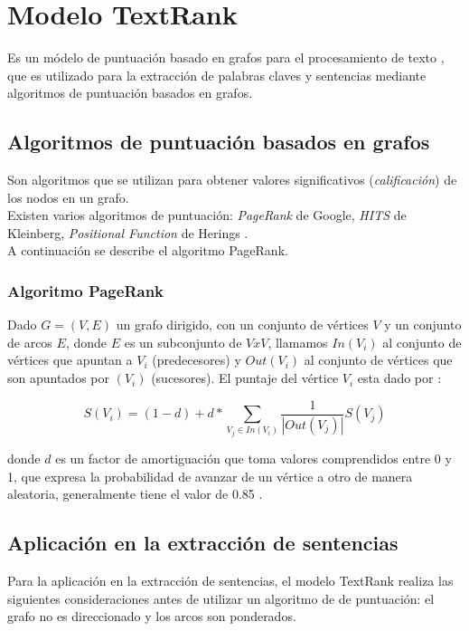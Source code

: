 \section{Modelo TextRank}
Es un m\'odelo de puntuaci\'on basado en grafos para el procesamiento de
texto \cite{RMPT04}, que es utilizado para la extracci\'on de palabras claves
y sentencias mediante algoritmos de puntuaci\'on basados en grafos.

\subsection{Algoritmos de puntuaci\'on basados en grafos}
Son algoritmos que se utilizan para obtener valores significativos
(\emph{calificaci\'on}) de los nodos en un grafo. \\

Existen varios algoritmos de puntuaci\'on: \emph{PageRank} de Google,
\emph{HITS} de Kleinberg, \emph{Positional Function} de Herings \cite{RM04}. \\

A continuaci\'on se describe el algoritmo PageRank.

\subsubsection{Algoritmo PageRank}
Dado $G=(V,E)$ un grafo dirigido, con un conjunto de v\'ertices $V$ y un conjunto
de arcos $E$, donde $E$ es un subconjunto de $V x V$, llamamos $In(V_i)$ al
conjunto de v\'ertices que apuntan a $V_i$ (predecesores) y $Out(V_i)$ al 
conjunto de v\'ertices que son apuntados por $(V_i)$ (sucesores). El puntaje del
v\'ertice $V_i$ esta dado por \cite{SBLP98}:

\begin{equation}
	S(V_i) = (1 - d) + d * \sum_{V_j\in In(V_i)}{\frac{1}{|Out(V_j)|}S(V_j)}
\end{equation}

donde $d$ es un factor de amortiguaci\'on que toma valores comprendidos entre
0 y 1, que expresa la probabilidad de avanzar de un v\'ertice a otro de manera
aleatoria, generalmente tiene el valor de 0.85 \cite{SBLP98}.

\subsection{Aplicaci\'on en la extracci\'on de sentencias} 
Para la aplicaci\'on en la extracci\'on de sentencias, el modelo TextRank realiza
las siguientes consideraciones antes de utilizar un algoritmo de de puntuaci\'on:
el grafo no es direccionado y los arcos son ponderados. \\

